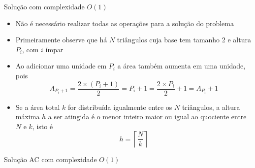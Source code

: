 \begin{frame}[fragile]{Solução com complexidade $O(1)$}

    \begin{itemize}
        \item Não é necessário realizar todas as operações para a solução do problema

        \item Primeiramente observe que há $N$ triângulos cuja base tem tamanho 2 e altura
            $P_i$, com $i$ ímpar

        \item Ao adicionar uma unidade em $P_i$ a área também aumenta em uma unidade, pois
        \[
            A_{P_i + 1} = \frac{2 \times (P_i + 1)}{2} = P_i + 1 = \frac{2\times  P_i}{2} + 1 = A_{P_i} + 1
        \]

        \item Se a área total $k$ for distribuída igualmente entre os $N$ triângulos, a altura
            máxima $h$ a ser atingida é o menor inteiro maior ou igual ao quociente entre $N$ e 
            $k$, isto é
        \[
            h = \left\lceil \frac{N}{k} \right\rceil
        \]
    \end{itemize}

\end{frame}

\begin{frame}[fragile]{Solução AC com complexidade $O(1)$}
\end{frame}
